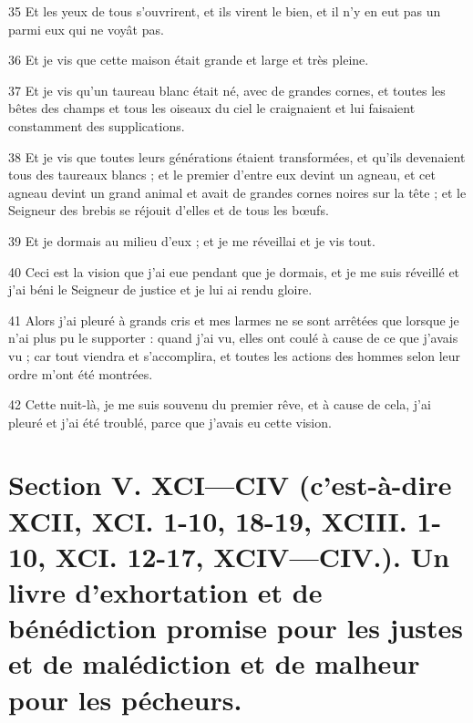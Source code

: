\par 35 Et les yeux de tous s'ouvrirent, et ils virent le bien, et il n'y en eut pas un parmi eux qui ne voyât pas.
\par 36 Et je vis que cette maison était grande et large et très pleine.
\par 37 Et je vis qu'un taureau blanc était né, avec de grandes cornes, et toutes les bêtes des champs et tous les oiseaux du ciel le craignaient et lui faisaient constamment des supplications.
\par 38 Et je vis que toutes leurs générations étaient transformées, et qu'ils devenaient tous des taureaux blancs ; et le premier d'entre eux devint un agneau, et cet agneau devint un grand animal et avait de grandes cornes noires sur la tête ; et le Seigneur des brebis se réjouit d'elles et de tous les bœufs.
\par 39 Et je dormais au milieu d'eux ; et je me réveillai et je vis tout.
\par 40 Ceci est la vision que j'ai eue pendant que je dormais, et je me suis réveillé et j'ai béni le Seigneur de justice et je lui ai rendu gloire.
\par 41 Alors j'ai pleuré à grands cris et mes larmes ne se sont arrêtées que lorsque je n'ai plus pu le supporter : quand j'ai vu, elles ont coulé à cause de ce que j'avais vu ; car tout viendra et s'accomplira, et toutes les actions des hommes selon leur ordre m'ont été montrées.
\par 42 Cette nuit-là, je me suis souvenu du premier rêve, et à cause de cela, j'ai pleuré et j'ai été troublé, parce que j'avais eu cette vision.

\part {Section V. XCI—CIV (c'est-à-dire XCII, XCI. 1-10, 18-19, XCIII. 1-10, XCI. 12-17, XCIV—CIV.). Un livre d'exhortation et de bénédiction promise pour les justes et de malédiction et de malheur pour les pécheurs.}


